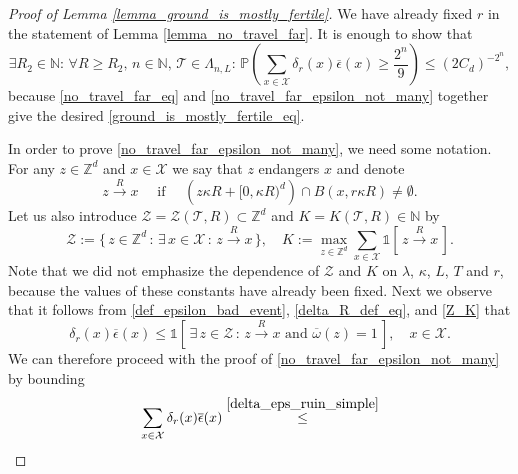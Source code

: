 \documentclass[a4paper,12pt]{article}
\begin{document}
\begin{proof}[Proof of Lemma \ref{lemma_ground_is_mostly_fertile}]
We have already fixed $r$ in the statement of Lemma \ref{lemma_no_travel_far}. It is enough to show that
\begin{equation}\label{no_travel_far_epsilon_not_many}
\exists  R_2 \in \mathbb{N}  : \, \forall  R \geq R_2, \, n \in \mathbb{N}, \, \mathcal{T} \in \Lambda_{n,L}  : \,
\mathbb{P}\left( \sum_{x \in \mathcal{X} } \delta_r(x)\overline{\epsilon}(x) \geq  \frac{2^n}{9} \right) \leq \left( 2 C_d  \right)^{-2^n},
\end{equation}
because \eqref{no_travel_far_eq} and \eqref{no_travel_far_epsilon_not_many} together give the desired \eqref{ground_is_mostly_fertile_eq}.

In order  to prove \eqref{no_travel_far_epsilon_not_many}, we need some notation. For any $z \in \mathbb{Z}^d$ and $x \in \mathcal{X}$ we
say that  $z$ endangers $x$ and denote
\begin{equation}\label{endangers_def}
 z \stackrel{R}{\rightarrow} x \quad \text{ if } \quad  \left(z \kappa R + [0,\kappa R)^d \right)\cap B(x,r\kappa R) \neq \emptyset.
 \end{equation}
Let us also introduce $\mathcal{Z}=\mathcal{Z}( \mathcal{T}, R ) \subset \mathbb{Z}^d $ and $K=K(\mathcal{T},R) \in \mathbb{N} $ by
\begin{equation}\label{Z_K}
  \mathcal{Z}:=\{\, z \in \mathbb{Z}^d \, : \, \exists \, x \in \mathcal{X} \, : \, z \stackrel{R}{\rightarrow} x \, \},
 \quad K:= \max_{z \in \mathbb{Z}^d } \sum_{ x \in \mathcal{X} } \mathds{1}\left[ \,  z \stackrel{R}{\rightarrow} x \, \right].
\end{equation}
Note that we did not emphasize the dependence of  $\mathcal{Z}$ and $K$ on $\lambda$, $\kappa$, $L$, $T$ and $r$, because the values of these constants
have already been fixed.
Next we observe that it follows from \eqref{def_epsilon_bad_event}, \eqref{delta_R_def_eq}, and \eqref{Z_K} that
\begin{equation}\label{delta_eps_ruin_simple}
  \delta_r(x)\overline{\epsilon}(x)  \leq
  \mathds{1}\left[ \,  \exists \, z \in \mathcal{Z} \, : \, z \stackrel{R}{\rightarrow} x \text{ and } \overline{\omega}(z)=1 \, \right]  , \quad x \in \mathcal{X}.
\end{equation}
We can therefore proceed with the proof of \eqref{no_travel_far_epsilon_not_many} by bounding
\begin{equation} \label{ruined_x_interchange_sums_bound}
\sum_{x \in \mathcal{X} }  \delta_r(x)\overline{\epsilon}(x) \stackrel{ \eqref{delta_eps_ruin_simple} }{\leq}

\end{equation}
\end{proof}
\end{document}
